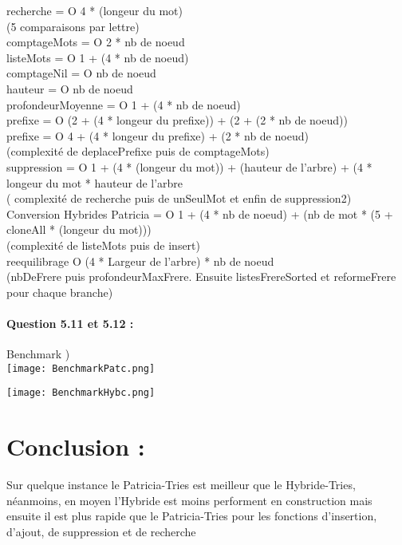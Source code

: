 \documentclass{article}
\begin{document}
recherche = O 4 * (longeur du mot)\\
\Rightarrow(5 comparaisons par lettre)\\

comptageMots = O 2 * nb de noeud\\

listeMots = O 1 + (4 * nb de noeud) \\

comptageNil = O nb de noeud\\

hauteur = O nb de noeud\\

profondeurMoyenne = O 1 + (4 * nb de noeud)\\

prefixe = O (2 + (4 * longeur du prefixe)) + (2 + (2 * nb de noeud))\\
prefixe = O 4 + (4 * longeur du prefixe) + (2 * nb de noeud)\\
\Rightarrow (complexit\'e de deplacePrefixe puis de comptageMots)\\

suppression = O 1 + (4 * (longeur du mot)) + (hauteur de l'arbre) + (4 * longeur du mot * hauteur de l'arbre\\
\Rightarrow ( complexit\'e de recherche puis de unSeulMot et enfin de suppression2)\\

Conversion Hybrides \Rightarrow Patricia = O 1 + (4 * nb de noeud) + (nb de mot * (5 + cloneAll * (longeur du mot)))\\
\Rightarrow (complexit\'e de listeMots puis de insert)\\

reequilibrage \Rightarrow O (4 * Largeur de l'arbre) * nb de noeud\\
\Rightarrow(nbDeFrere puis profondeurMaxFrere. Ensuite listesFrereSorted et reformeFrere pour chaque branche)\\


\newpage
\paragraph{Question 5.11 et 5.12 :}

Benchmark )\\

\texttt{[image: BenchmarkPatc.png]}

\texttt{[image: BenchmarkHybc.png]}

\newpage

\section{Conclusion :}

Sur quelque instance le Patricia-Tries est meilleur que le Hybride-Tries,
n\'eanmoins, en moyen l'Hybride est moins performent en construction mais ensuite
il est plus rapide que le Patricia-Tries pour les fonctions d'insertion,
d'ajout, de suppression et de recherche\\
\end{document}
